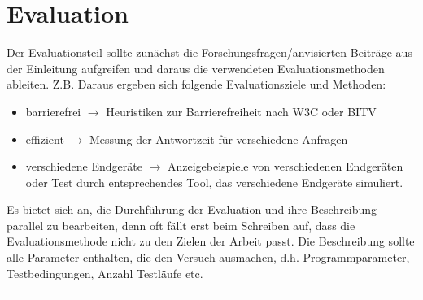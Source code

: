 
\chapter{Evaluation}
Der Evaluationsteil sollte zunächst die Forschungsfragen/anvisierten Beiträge aus der Einleitung aufgreifen und daraus die verwendeten Evaluationsmethoden ableiten. Z.B.  Daraus ergeben sich folgende Evaluationsziele und Methoden:
\begin{itemize}
  \item barrierefrei $\rightarrow$ Heuristiken zur Barrierefreiheit nach W3C oder BITV
  \item effizient $\rightarrow$ Messung der Antwortzeit für verschiedene Anfragen
  \item verschiedene Endgeräte $\rightarrow$ Anzeigebeispiele von verschiedenen Endgeräten oder Test durch entsprechendes Tool, das verschiedene Endgeräte simuliert.
\end{itemize}

Es bietet sich an, die Durchführung der Evaluation und ihre Beschreibung parallel zu bearbeiten, denn oft fällt erst beim Schreiben auf, dass die Evaluationsmethode nicht zu den Zielen der Arbeit passt. Die Beschreibung sollte alle Parameter enthalten, die den Versuch ausmachen, d.h. Programmparameter, Testbedingungen, Anzahl Testläufe etc.

\hfil\rule{0.4\textwidth}{0.4pt}

\Blindtext[6]